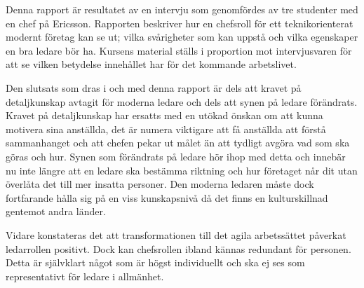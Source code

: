
Denna rapport är resultatet av en intervju som genomfördes av tre studenter med en chef på Ericsson. Rapporten beskriver hur en chefsroll för ett teknikorienterat modernt företag kan se ut; vilka svårigheter som kan uppstå och vilka egenskaper en bra ledare bör ha. Kursens material ställs i proportion mot intervjusvaren för att se vilken betydelse innehållet har för det kommande arbetslivet.

Den slutsats som dras i och med denna rapport är dels att kravet på detaljkunskap avtagit för moderna ledare och dels att synen på ledare förändrats. Kravet på detaljkunskap har ersatts med en utökad önskan om att kunna motivera sina anställda, det är numera viktigare att få anställda att förstå sammanhanget och att chefen pekar ut målet än att tydligt avgöra vad som ska göras och hur. Synen som förändrats på ledare hör ihop med detta och innebär nu inte längre att en ledare ska bestämma riktning och hur företaget når dit utan överlåta det till mer insatta personer. Den moderna ledaren måste dock fortfarande hålla sig på en viss kunskapsnivå då det finns en kulturskillnad gentemot andra länder.

Vidare konstateras det att transformationen till det agila arbetssättet påverkat ledarrollen positivt. Dock kan chefsrollen ibland kännas redundant för personen. Detta är självklart något som är högst individuellt och ska ej ses som representativt för ledare i allmänhet.